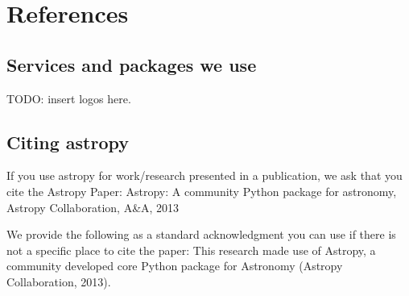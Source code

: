 \documentclass{iau}
\begin{document}
\section{References}
\subsection{Services and packages we use}

TODO: insert logos here.

\subsection{Citing astropy}

If you use astropy for work/research presented in a publication, we ask that
you cite the Astropy Paper: Astropy: A community Python package for
astronomy, Astropy Collaboration, A\&A, 2013

We provide the following as a standard acknowledgment you can use if there
is not a specific place to cite the paper: This research made use of
Astropy, a community developed core Python package for Astronomy (Astropy
Collaboration, 2013).
\end{document}
